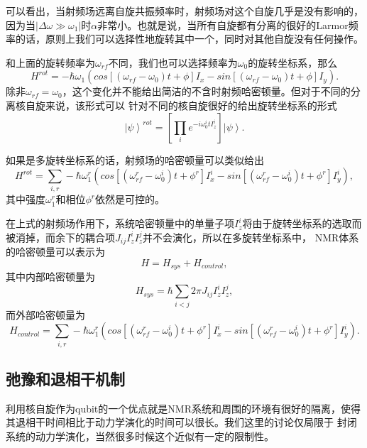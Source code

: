 可以看出，当射频场远离自旋共振频率时，射频场对这个自旋几乎是没有影响的，因为当$|\Delta\omega\gg \omega_1|$时$\alpha$非常小。也就是说，当所有自旋都有分离的很好的Larmor频率的话，原则上我们可以选择性地旋转其中一个，同时对其他自旋没有任何操作。

和上面的旋转频率为$\omega_{rf}$不同，我们也可以选择频率为$\omega_0$的旋转坐标系，那么
\begin{equation}\label{aaa}
H^{rot} = -\hbar\omega_1(cos[(\omega_{rf}-\omega_0)t+\phi]I_x-sin[(\omega_{rf}-\omega_0)t+\phi]I_y).
\end{equation}
除非$\omega_{rf}=\omega_0$，这个变化并不能给出简洁的不含时射频哈密顿量。但对于不同的分离核自旋来说，该形式可以
针对不同的核自旋很好的给出旋转坐标系的形式
\begin{equation}\label{aaa}
\left\vert  \psi \right\rangle^{rot} =[\prod_i e^{-i\omega_0^itI_z^i}]\left\vert  \psi \right\rangle.
\end{equation}

如果是多旋转坐标系的话，射频场的哈密顿量可以类似给出
\begin{equation}\label{aaa}
H^{rot} = \sum_{i,r} -\hbar\omega_1^r(cos[(\omega_{rf}^r-\omega_0^i)t+\phi^r]I_x^i-sin[(\omega_{rf}^r-\omega_0^i)t+\phi^r]I_y^i),
\end{equation}
其中强度$\omega_1^r$和相位$\phi^r$依然是可控的。

在上式的射频场作用下，系统哈密顿量中的单量子项$I_z^i$将由于旋转坐标系的选取而被消掉，而余下的耦合项$J_{ij}I_z^iI_z^j$并不会演化，所以在多旋转坐标系中，
NMR体系的哈密顿量可以表示为
\begin{equation}\label{aaa}
H = H_{sys}+H_{control},
\end{equation}
其中内部哈密顿量为
\begin{equation}\label{aaa}
H_{sys} =  \hbar\sum_{i<j} 2\pi J_{ij}I_z^iI_z^j,
\end{equation}
而外部哈密顿量为
\begin{equation}\label{aaa}
H_{control} =  \sum_{i,r} -\hbar\omega_1^r(cos[(\omega_{rf}^r-\omega_0^i)t+\phi^r]I_x^i-sin[(\omega_{rf}^r-\omega_0^i)t+\phi^r]I_y^i).
\end{equation}

\subsection{弛豫和退相干机制}

利用核自旋作为qubit的一个优点就是NMR系统和周围的环境有很好的隔离，使得其退相干时间相比于动力学演化的时间可以很长。我们这里的讨论仅局限于
封闭系统的动力学演化，当然很多时候这个近似有一定的限制性。

